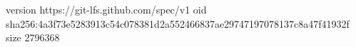 version https://git-lfs.github.com/spec/v1
oid sha256:4a3f73e5283913c54c078381d2a552466837ae29747197078137c8a47f41932f
size 2796368
